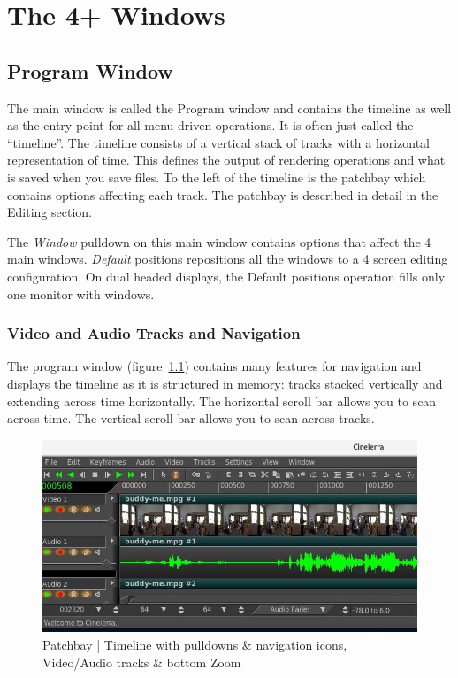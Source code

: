 \chapter{The 4+ Windows}%
\label{cha:the_4_windows}

\section{Program Window}%
\label{sec:program_window}

The main window is called the Program window and contains the timeline as well as the entry point for all menu driven operations.  
It is often just called the “timeline”.  
The timeline consists of a vertical stack of tracks with a horizontal representation of time. 
This defines the output of rendering operations and what is saved when you save files. 
To the left of the timeline is the patchbay which contains options affecting each track.  
The patchbay is described in detail in the Editing section.

The \emph{Window} pulldown on this main window contains options that affect the 4 main windows. 
\emph{Default} positions repositions all the windows to a 4 screen editing configuration.
On dual headed displays,
the Default positions operation fills only one monitor with windows.

\subsection{Video and Audio Tracks and Navigation}%
\label{sub:video_and_audio_tracks_and_navigation}

The program window (figure~\ref{fig:pathbay})   contains many features for navigation and displays the timeline as it is structured in memory: tracks stacked vertically and extending across time horizontally. 
The horizontal scroll bar allows you to scan across time. 
The vertical scroll bar allows you to scan across tracks.

\begin{figure}[htpb]
    \centering
    \includegraphics[width=0.8\linewidth]{images/pathbay.png}
    \caption{Patchbay  | Timeline with pulldowns \& navigation icons, Video/Audio tracks \& bottom Zoom}
    \label{fig:pathbay}
\end{figure}


